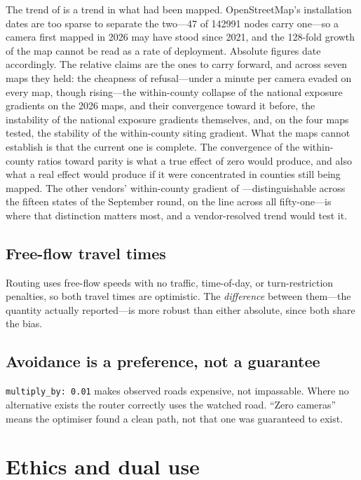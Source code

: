 \documentclass[11pt,twoside]{article}
\begin{document}
The trend of  is a trend in what had been mapped. OpenStreetMap's
installation dates are too sparse to separate the two---47 of \num{142991} nodes carry
one---so a camera first mapped in 2026 may have stood since 2021, and the 128-fold growth of
the map cannot be read as a rate of deployment. Absolute figures date accordingly. The
relative claims are the ones to carry forward, and across seven maps they held: the
cheapness of refusal---under a minute per camera evaded on every map, though rising---the
within-county collapse of the national exposure gradients on the 2026 maps, and their
convergence toward it before, the instability of the national exposure gradients themselves, and, on the four maps
tested, the stability of the within-county siting gradient. What the maps cannot establish is that
the current one is complete. The convergence of the within-county ratios toward parity is
what a true effect of zero would produce, and also what a real effect would produce if it
were concentrated in counties still being mapped. The other vendors' within-county gradient
of ---distinguishable across the fifteen states of the September round,
on the line across all fifty-one---is where that distinction matters most, and a
vendor-resolved trend would test it.

\subsection{Free-flow travel times}

Routing uses free-flow speeds with no traffic, time-of-day, or turn-restriction penalties,
so both travel times are optimistic. The \emph{difference} between them---the quantity
actually reported---is more robust than either absolute, since both share the bias.

\subsection{Avoidance is a preference, not a guarantee}

\texttt{multiply\_by: 0.01} makes observed roads expensive, not impassable. Where no
alternative exists the router correctly uses the watched road. ``Zero cameras'' means the
optimiser found a clean path, not that one was guaranteed to exist.

\section{Ethics and dual use}
\label{sec:ethics}
\end{document}
